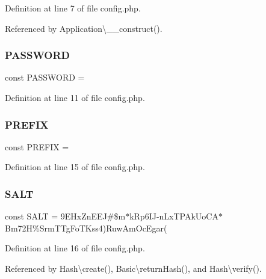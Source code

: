Definition at line 7 of file config.\+php.



Referenced by Application\textbackslash{}\+\_\+\+\_\+construct().

\hypertarget{config_8php_a627633cf1f3c4ee60fcc7d025a4039ed}{}\label{config_8php_a627633cf1f3c4ee60fcc7d025a4039ed} 
\subsubsection{\texorpdfstring{P\+A\+S\+S\+W\+O\+RD}{PASSWORD}}
{\footnotesize\ttfamily const P\+A\+S\+S\+W\+O\+RD = \textquotesingle{}\textquotesingle{}}



Definition at line 11 of file config.\+php.

\hypertarget{config_8php_a2a00ef970c682ccf10b5376d22fa5c8a}{}\label{config_8php_a2a00ef970c682ccf10b5376d22fa5c8a} 
\subsubsection{\texorpdfstring{P\+R\+E\+F\+IX}{PREFIX}}
{\footnotesize\ttfamily const P\+R\+E\+F\+IX = \textquotesingle{}\textquotesingle{}}



Definition at line 15 of file config.\+php.

\hypertarget{config_8php_a6d448b74f10f8080293b329a47a046b4}{}\label{config_8php_a6d448b74f10f8080293b329a47a046b4} 
\subsubsection{\texorpdfstring{S\+A\+LT}{SALT}}
{\footnotesize\ttfamily const S\+A\+LT = \textquotesingle{}9\+E\+Hx\+Zn\+E\+E\+J\#\$m$\ast$k\+Rp6\+I\+J-\/n\+Lx\+T\+P\+Ak\+Uo\+C\+A$\ast$\+Bm72\+H\%\+Srm\+T\+Tg\+Fo\+T\+Kss4)\+Ruw\+Am\+Oc\+Egar(\textquotesingle{}}



Definition at line 16 of file config.\+php.



Referenced by Hash\textbackslash{}create(), Basic\textbackslash{}return\+Hash(), and Hash\textbackslash{}verify().

